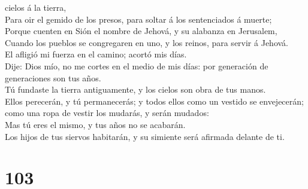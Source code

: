 cielos á la tierra,\\
 Para oir el gemido de los presos, para soltar á los
sentenciados á muerte;\\
 Porque cuenten en Sión el nombre de Jehová, y su alabanza
en Jerusalem,\\
 Cuando los pueblos se congregaren en uno, y los reinos,
para servir á Jehová.\\
 El afligió mi fuerza en el camino; acortó mis días.\\
 Dije: Dios mío, no me cortes en el medio de mis días: por
generación de generaciones son tus años.\\
 Tú fundaste la tierra antiguamente, y los cielos son obra
de tus manos.\\
 Ellos perecerán, y tú permanecerás; y todos ellos como un
vestido se envejecerán; como una ropa de vestir los mudarás, y serán
mudados:\\
 Mas tú eres el mismo, y tus años no se acabarán.\\
 Los hijos de tus siervos habitarán, y su simiente será
afirmada delante de ti.

\hypertarget{section-102}{%
\section{103}\label{section-102}}

